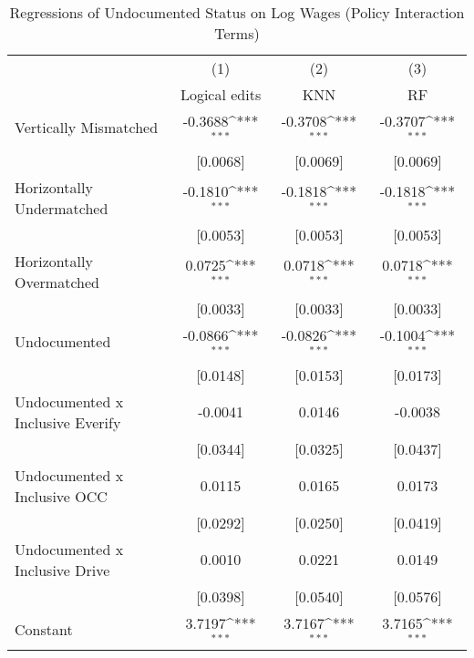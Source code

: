 \begin{table}[htbp]\centering
\def\sym#1{\ifmmode^{#1}\else\(^{#1}\)\fi}
\caption{Regressions of Undocumented Status on Log Wages (Policy Interaction Terms)}
\begin{tabular}{l*{3}{c}}
\toprule
                    &\multicolumn{1}{c}{(1)}         &\multicolumn{1}{c}{(2)}         &\multicolumn{1}{c}{(3)}         \\
                    &Logical edits         &         KNN         &          RF         \\
\midrule
Vertically Mismatched&     -0.3688\sym{***}&     -0.3708\sym{***}&     -0.3707\sym{***}\\
                    &    [0.0068]         &    [0.0069]         &    [0.0069]         \\
\addlinespace
Horizontally Undermatched&     -0.1810\sym{***}&     -0.1818\sym{***}&     -0.1818\sym{***}\\
                    &    [0.0053]         &    [0.0053]         &    [0.0053]         \\
\addlinespace
Horizontally Overmatched&      0.0725\sym{***}&      0.0718\sym{***}&      0.0718\sym{***}\\
                    &    [0.0033]         &    [0.0033]         &    [0.0033]         \\
\addlinespace
Undocumented        &     -0.0866\sym{***}&     -0.0826\sym{***}&     -0.1004\sym{***}\\
                    &    [0.0148]         &    [0.0153]         &    [0.0173]         \\
\addlinespace
Undocumented x Inclusive Everify&     -0.0041         &      0.0146         &     -0.0038         \\
                    &    [0.0344]         &    [0.0325]         &    [0.0437]         \\
\addlinespace
Undocumented x Inclusive OCC&      0.0115         &      0.0165         &      0.0173         \\
                    &    [0.0292]         &    [0.0250]         &    [0.0419]         \\
\addlinespace
Undocumented x Inclusive Drive&      0.0010         &      0.0221         &      0.0149         \\
                    &    [0.0398]         &    [0.0540]         &    [0.0576]         \\
\addlinespace
Constant            &      3.7197\sym{***}&      3.7167\sym{***}&      3.7165\sym{***}\\

\end{tabular}
\end{table}
